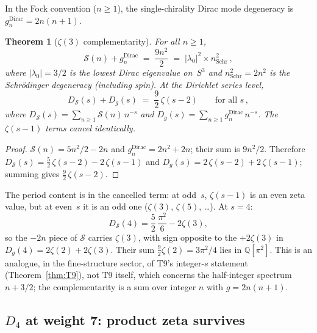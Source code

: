 \documentclass[11pt]{article}
\newtheorem{theorem}{Theorem}
\begin{document}
In the Fock convention ($n \ge 1$), the single-chirality Dirac mode
degeneracy is $g_n^{\mathrm{Dirac}} = 2n(n+1)$.

\begin{theorem}[$\zeta(3)$ complementarity]
\label{thm:zeta3_complement}
For all $n \ge 1$,
\begin{equation}
\label{eq:shell_complement}
  \mathcal{S}(n) + g_n^{\mathrm{Dirac}} \;=\; \frac{9n^2}{2}
  \;=\; |\lambda_0|^2 \times n^2_{\mathrm{Schr}}\,,
\end{equation}
where $|\lambda_0| = 3/2$ is the lowest Dirac eigenvalue on~$S^3$
and $n^2_{\mathrm{Schr}} = 2n^2$ is the Schr\"odinger degeneracy
(including spin).
At the Dirichlet series level,
\begin{equation}
\label{eq:dirichlet_complement}
  D_{\mathcal{S}}(s) + D_{g}(s) \;=\; \frac{9}{2}\,\zeta(s{-}2)
  \qquad \text{for all } s\,,
\end{equation}
where $D_{\mathcal{S}}(s) = \sum_{n \ge 1} \mathcal{S}(n)\,n^{-s}$
and $D_{g}(s) = \sum_{n \ge 1} g_n^{\mathrm{Dirac}}\,n^{-s}$.
The $\zeta(s{-}1)$ terms cancel identically.
\end{theorem}

\begin{proof}
$\mathcal{S}(n) = 5n^2/2 - 2n$ and $g_n^{\mathrm{Dirac}} = 2n^2 + 2n$;
their sum is $9n^2/2$.  Therefore
$D_{\mathcal{S}}(s) = \tfrac{5}{2}\,\zeta(s{-}2) - 2\,\zeta(s{-}1)$
and $D_{g}(s) = 2\,\zeta(s{-}2) + 2\,\zeta(s{-}1)$; summing gives
$\tfrac{9}{2}\,\zeta(s{-}2)$.
\end{proof}

The period content is in the cancelled term: at odd~$s$,
$\zeta(s{-}1)$ is an even zeta value, but at even~$s$ it is an odd
one ($\zeta(3)$, $\zeta(5)$, \ldots).  At $s = 4$:
\begin{equation}
  D_{\mathcal{S}}(4) = \frac{5}{2}\,\frac{\pi^2}{6} - 2\zeta(3),
\end{equation}
so the $-2n$ piece of $\mathcal{S}$ carries $\zeta(3)$, with sign
opposite to the $+2\zeta(3)$ in $D_{g}(4) = 2\zeta(2) + 2\zeta(3)$.
Their sum $\tfrac{9}{2}\zeta(2) = 3\pi^2/4$ lies in $\mathbb{Q}[\pi^2]$.
This is an analogue, in the fine-structure sector, of T9's
integer-$s$ statement (Theorem~\ref{thm:T9}), not T9 itself, which
concerns the half-integer spectrum $n + 3/2$; the complementarity is a
sum over integer $n$ with $g = 2n(n+1)$.

\subsection{$D_4$ at weight 7: product zeta survives}
\end{document}
